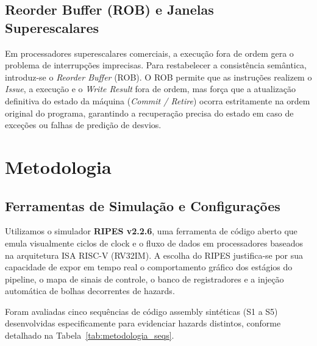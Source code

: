 \documentclass[12pt,a4paper]{article}
\begin{document}
\subsection{Reorder Buffer (ROB) e Janelas Superescalares}
Em processadores superescalares comerciais, a execução fora de ordem gera o problema de interrupções imprecisas. Para restabelecer a consistência semântica, introduz-se o \textit{Reorder Buffer} (ROB). O ROB permite que as instruções realizem o \textit{Issue}, a execução e o \textit{Write Result} fora de ordem, mas força que a atualização definitiva do estado da máquina (\textit{Commit / Retire}) ocorra estritamente na ordem original do programa, garantindo a recuperação precisa do estado em caso de exceções ou falhas de predição de desvios.
\newpage

\section{Metodologia}
\label{sec:metodologia}

\subsection{Ferramentas de Simulação e Configurações}
Utilizamos o simulador \textbf{RIPES v2.2.6}, uma ferramenta de código aberto que emula visualmente ciclos de clock e o fluxo de dados em processadores baseados na arquitetura ISA RISC-V (RV32IM). A escolha do RIPES justifica-se por sua capacidade de expor em tempo real o comportamento gráfico dos estágios do pipeline, o mapa de sinais de controle, o banco de registradores e a injeção automática de bolhas decorrentes de hazards.

Foram avaliadas cinco sequências de código assembly sintéticas (S1 a S5) desenvolvidas especificamente para evidenciar hazards distintos, conforme detalhado na Tabela~\ref{tab:metodologia_seqs}.

\begin{table}[H]
\centering
\caption{Mapeamento pedagógico das sequências de teste S1--S5}
\label{tab:metodologia_seqs}
\end{table}
\end{document}
